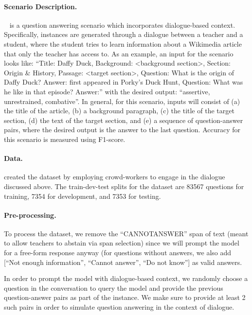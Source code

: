 \paragraph{Scenario Description.}
\quac~\citep{choi2018quac} is a question answering scenario which incorporates dialogue-based context.
Specifically, instances are generated through a dialogue between a teacher and a student, where the student tries to learn information about a Wikimedia article that only the teacher has access to.
As an example, an input for the scenario looks like: ``Title: Daffy Duck, Background: <background section>, Section: Origin \& History, Passage: <target section>, Question: What is the origin of Daffy Duck? Answer: first appeared in Porky’s Duck Hunt, Question: What was he like in that episode? Answer:''
with the desired output: ``assertive, unrestrained, combative''.
In general, for this scenario, inputs will consist of (a) the title of the article, (b) a background paragraph, (c) the title of the target section, (d) the text of the target section, and (e) a sequence of question-answer pairs, where the desired output is the answer to the last question.
Accuracy for this scenario is measured using F1-score.

\paragraph{Data.}
\citet{choi2018quac} created the dataset by employing crowd-workers to engage in the dialogue discussed above.
The train-dev-test splits for the dataset are 83567 questions for training, 7354 for development, and 7353 for testing.

\paragraph{Pre-processing.}
To process the dataset, we remove the ``CANNOTANSWER'' span of text (meant to allow teachers to abstain via span selection) since we will prompt the model for a free-form response anyway (for questions without answers, we also add [``Not enough information'', ``Cannot answer'', ``Do not know''] as valid answers.

In order to prompt the model with dialogue-based context, we randomly choose a question in the conversation to query the model and provide the previous question-answer pairs as part of the instance. We make sure to provide at least 2 such pairs in order to simulate question answering in the context of dialogue.


